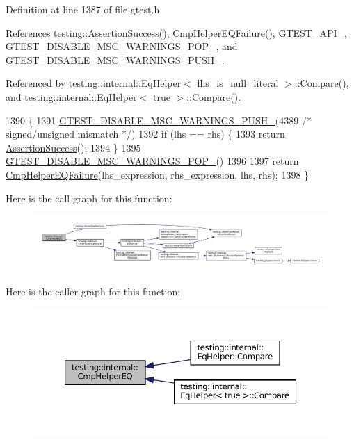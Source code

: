 Definition at line 1387 of file gtest.\+h.



References testing\+::\+Assertion\+Success(), Cmp\+Helper\+E\+Q\+Failure(), G\+T\+E\+S\+T\+\_\+\+A\+P\+I\+\_\+, G\+T\+E\+S\+T\+\_\+\+D\+I\+S\+A\+B\+L\+E\+\_\+\+M\+S\+C\+\_\+\+W\+A\+R\+N\+I\+N\+G\+S\+\_\+\+P\+O\+P\+\_\+, and G\+T\+E\+S\+T\+\_\+\+D\+I\+S\+A\+B\+L\+E\+\_\+\+M\+S\+C\+\_\+\+W\+A\+R\+N\+I\+N\+G\+S\+\_\+\+P\+U\+S\+H\+\_\+.



Referenced by testing\+::internal\+::\+Eq\+Helper$<$ lhs\+\_\+is\+\_\+null\+\_\+literal $>$\+::\+Compare(), and testing\+::internal\+::\+Eq\+Helper$<$ true $>$\+::\+Compare().


\begin{DoxyCode}
1390                                            \{
1391 \hyperlink{gtest-port_8h_a86994cc68e844d8b82089c70408dfc61}{GTEST\_DISABLE\_MSC\_WARNINGS\_PUSH\_}(4389 \textcolor{comment}{/* signed/unsigned mismatch */})
1392   if (lhs == rhs) \{
1393     \textcolor{keywordflow}{return} \hyperlink{namespacetesting_ac1d0baedb17286c5c6c87bd1a45da8ac}{AssertionSuccess}();
1394   \}
1395 \hyperlink{gtest-port_8h_ab4c44546d6d9aced68993b87b608fc06}{GTEST\_DISABLE\_MSC\_WARNINGS\_POP\_}()
1396 
1397   return \hyperlink{namespacetesting_1_1internal_a1def8ec9393360a1b34a20528703e7f7}{CmpHelperEQFailure}(lhs\_expression, rhs\_expression, lhs, rhs);
1398 \}
\end{DoxyCode}
Here is the call graph for this function\+:
\nopagebreak
\begin{figure}[H]
\begin{center}
\leavevmode
\includegraphics[width=350pt]{namespacetesting_1_1internal_a4638c74d9b32e971f9b321af6fafc2f1_cgraph}
\end{center}
\end{figure}
Here is the caller graph for this function\+:
\nopagebreak
\begin{figure}[H]
\begin{center}
\leavevmode
\includegraphics[width=350pt]{namespacetesting_1_1internal_a4638c74d9b32e971f9b321af6fafc2f1_icgraph}
\end{center}
\end{figure}
